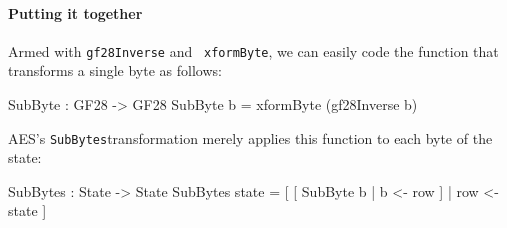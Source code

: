 
\paragraph*{Putting it together} Armed with {\tt gf28Inverse} and {\tt
  xformByte}, we can easily code the function that transforms a single
byte as follows:
\begin{code}
  SubByte : GF28 -> GF28
  SubByte b = xformByte (gf28Inverse b)
\end{code}
AES's {\tt SubBytes}\indAES transformation merely applies this
function to each byte of the state:
\begin{code}
  SubBytes : State -> State
  SubBytes state = [ [ SubByte b | b <- row ] | row <- state ]
\end{code}

